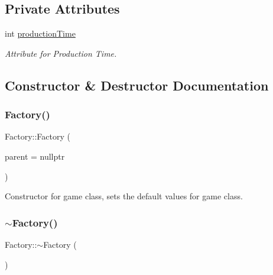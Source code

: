 \subsection*{Private Attributes}
\begin{DoxyCompactItemize}
\item 
int \hyperlink{class_factory_ab3a36b3ceb997d9e3fcc534c45fef354}{production\+Time}
\begin{DoxyCompactList}\small\item\em Attribute for Production Time. \end{DoxyCompactList}\end{DoxyCompactItemize}


\subsection{Constructor \& Destructor Documentation}
\mbox{\label{class_factory_a32bc190034f66d7e495cbcc4a7dfad30}} 
\subsubsection{\texorpdfstring{Factory()}{Factory()}}
{\footnotesize\ttfamily Factory\+::\+Factory (\begin{DoxyParamCaption}\item[{Q\+Object $\ast$}]{parent = {\ttfamily nullptr} }\end{DoxyParamCaption})\hspace{0.3cm}{\ttfamily [explicit]}}



Constructor for game class, sets the default values for game class. 

\mbox{\label{class_factory_a8f71456f48e4df402c778a44191ff40e}} 
\subsubsection{\texorpdfstring{$\sim$\+Factory()}{~Factory()}}
{\footnotesize\ttfamily Factory\+::$\sim$\+Factory (\begin{DoxyParamCaption}{ }\end{DoxyParamCaption})}



